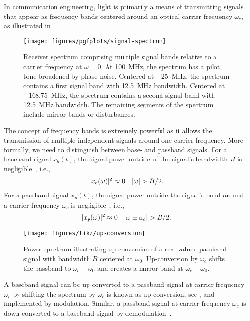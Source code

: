 In communication engineering, light is primarily a means of transmitting signals that appear as frequency bands centered around an optical carrier frequency $\omega_c$, as illustrated in .
\begin{figure}[ht]
	\centering
	\texttt{[image: figures/pgfplots/signal-spectrum]}
	\caption{Receiver spectrum comprising multiple signal bands relative to a carrier frequency at $\omega=0$. At \SI{+100}{\mega\hertz}, the spectrum has a pilot tone broadened by phase noise. Centered at \SI{-25}{\mega\hertz}, the spectrum contains a first signal band with \SI{12.5}{\mega\hertz} bandwidth. Centered at \SI{-168.75}{\mega\hertz}, the spectrum contains a second signal band with \SI{12.5}{\mega\hertz} bandwidth. The remaining segments of the spectrum include mirror bands or disturbances.}\label{fig:signal_spectrum}
\end{figure}
The concept of frequency bands is extremely powerful as it allows the transmission of multiple independent signals around one carrier frequency.
More formally, we need to distinguish between base- and passband signals.
For a baseband signal $x_b(t)$, the signal power outside of the signal's bandwidth $B$ is negligible~\cite[p.~15]{Madhow2008}, i.e.,
\begin{align}
	\lvert x_b(\omega)\rvert^2
	\approx
	0
	&&
	\lvert\omega\rvert
	>
	B/2
	.
\end{align}
For a passband signal $x_p(t)$, the signal power outside the signal's band around a carrier frequency $\omega_c$ is negligible~\cite[p.~16]{Madhow2008}, i.e.,
\begin{align}
	\lvert x_p(\omega)\rvert^2
	\approx
	0
	&&
	\lvert\omega\pm\omega_c\rvert
	>
	B/2
	.	
\end{align}
\begin{figure}[ht]
	\centering
	\texttt{[image: figures/tikz/up-conversion]}
	\caption{Power spectrum illustrating up-conversion of a real-valued passband signal with bandwidth $B$ centered at $\omega_0$. Up-conversion by $\omega_c$ shifts the passband to $\omega_c+\omega_0$ and creates a mirror band at $\omega_c-\omega_0$.}\label{fig:up_conversion}
\end{figure}
A baseband signal can be up-converted to a passband signal at carrier frequency $\omega_c$ by shifting the spectrum by $\omega_c$ is known as up-conversion, see , and implemented by modulation.
Similar, a passband signal at carrier frequency $\omega_c$ is down-converted to a baseband signal by demodulation~\cite[p.~26]{Madhow2008}.


